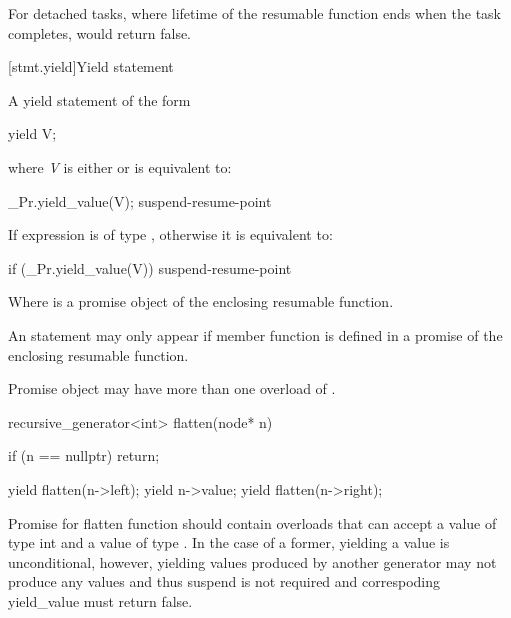 For detached tasks, where lifetime of the resumable function ends
when the task completes,  would return false.
\exitnote

[stmt.yield]{Yield statement}%

\pnum
A yield statement of the form

\begin{codeblock}
	yield V;
\end{codeblock}

where \textit{V} is either  or  is equivalent to:

\begin{codeblock}
	_Pr.yield_value(V);
	suspend-resume-point
\end{codeblock}

If  expression is of type , otherwise it is equivalent to:

\begin{codeblock}
	if (_Pr.yield_value(V)) {
		suspend-resume-point
	}
\end{codeblock}

Where  is a promise object of the enclosing resumable function.

\pnum
An  statement may only appear if  member
function is defined in a promise of the enclosing resumable function.

\pnum
Promise object may have more than one overload of .

\enterexample
\begin{codeblock}
	recursive_generator<int> flatten(node* n)
	{
		if (n == nullptr)
			return;
			
		yield flatten(n->left);
		yield n->value;
		yield flatten(n->right);
	}
\end{codeblock}

Promise for flatten function should contain overloads that can accept a value of type int and a value of type .
In the case of a former, yielding a value is unconditional, however, yielding values produced by another generator may not produce
any values and thus suspend is not required and correspoding yield_value must return false. 
\exitexample